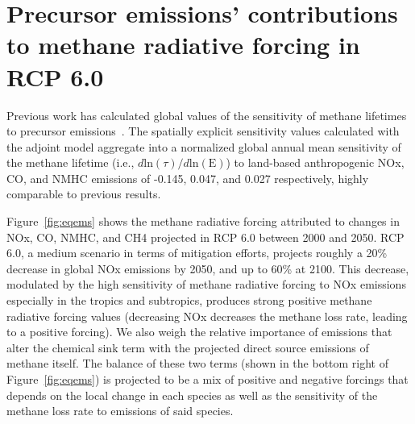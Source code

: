 \section{Precursor emissions' contributions to methane radiative forcing in RCP 6.0}

Previous work has calculated global values of the sensitivity of methane lifetimes to precursor emissions~\citep{ref:fry2012,ref:holmes2013}. The spatially explicit sensitivity values calculated with the adjoint model aggregate into a normalized global annual mean sensitivity of the methane lifetime (i.e., $d \mathrm{ln}(\tau)/d\mathrm{ln}(\mathrm{E})$) to land-based anthropogenic NOx, CO, and NMHC emissions of -0.145, 0.047, and 0.027 respectively, highly comparable to previous results.


Figure~\ref{fig:eqems} shows the methane radiative forcing attributed to changes in NOx, CO, NMHC, and CH4 projected in RCP 6.0 between 2000 and 2050. RCP 6.0, a medium scenario in terms of mitigation efforts, projects roughly a 20\% decrease in global NOx emissions by 2050, and up to 60\% at 2100. This decrease, modulated by the high sensitivity of methane radiative forcing to NOx emissions especially in the tropics and subtropics, produces strong positive methane radiative forcing values (decreasing NOx decreases the methane loss rate, leading to a positive forcing). We also weigh the relative importance of emissions that alter the chemical sink term with the projected direct source emissions of methane itself. The balance of these two terms (shown in the bottom right of Figure~\ref{fig:eqems}) is projected to be a mix of positive and negative forcings that depends on the local change in each species as well as the sensitivity of the methane loss rate to emissions of said species.

